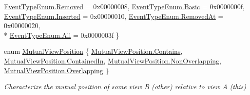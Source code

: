 \begin{DoxyCompactItemize}
\hyperlink{namespace_c5_a9143bfd561fffa025d21561674758008a93f07b720ebf7d1246512569761a5804}{Event\+Type\+Enum.\+Removed} = 0x00000008, 
\hyperlink{namespace_c5_a9143bfd561fffa025d21561674758008a972e73b7a882d0802a4e3a16946a2f94}{Event\+Type\+Enum.\+Basic} = 0x0000000f, 
\hyperlink{namespace_c5_a9143bfd561fffa025d21561674758008a157d034f9c98a305eb73776582550027}{Event\+Type\+Enum.\+Inserted} = 0x00000010, 
\hyperlink{namespace_c5_a9143bfd561fffa025d21561674758008a453b7f3363ab469a21a00dfce8d09735}{Event\+Type\+Enum.\+Removed\+At} = 0x00000020, 
\\*
\hyperlink{namespace_c5_a9143bfd561fffa025d21561674758008ab1c94ca2fbc3e78fc30069c8d0f01680}{Event\+Type\+Enum.\+All} = 0x0000003f
 \}
\item 
enum \hyperlink{namespace_c5_a93460c84ab30d45612d93f6dd739f2f5}{Mutual\+View\+Position} \{ \hyperlink{namespace_c5_a93460c84ab30d45612d93f6dd739f2f5ab270372be5b4433b4736daaf25e1c74e}{Mutual\+View\+Position.\+Contains}, 
\hyperlink{namespace_c5_a93460c84ab30d45612d93f6dd739f2f5ac884e0f8af570938d791c4cdd795aabb}{Mutual\+View\+Position.\+Contained\+In}, 
\hyperlink{namespace_c5_a93460c84ab30d45612d93f6dd739f2f5a8172d30fe7e15e881ee3508a705e58e4}{Mutual\+View\+Position.\+Non\+Overlapping}, 
\hyperlink{namespace_c5_a93460c84ab30d45612d93f6dd739f2f5ac309128476f539aaa98e2de4e5380c7f}{Mutual\+View\+Position.\+Overlapping}
 \}\begin{DoxyCompactList}\small\item\em Characterize the mutual position of some view B (other) relative to view A (this) \end{DoxyCompactList}
\end{DoxyCompactItemize}
